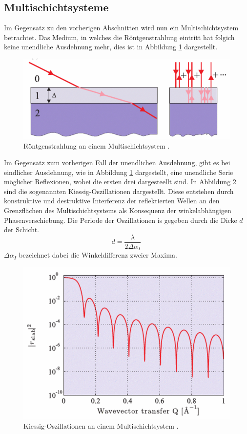 \subsection{Multischichtsysteme} \label{sec:multischicht}
Im Gegensatz zu den vorherigen Abschnitten wird nun ein Multischichtsystem betrachtet.
Das Medium, in welches die Röntgenstrahlung eintritt hat folgich keine unendliche Ausdehnung mehr, 
dies ist in Abbildung \ref{fig:multischicht} dargestellt.
\begin{figure}[H]
    \centering
    \includegraphics[scale=0.5]{Bilder/multischicht.png}
    \caption{Röntgenstrahlung an einem Multischichtsystem \cite{als-nielsen2011}.}
    \label{fig:multischicht}
\end{figure}
Im Gegensatz zum vorherigen Fall der unendlichen Ausdehnung, gibt es bei eindlicher Ausdehnung, 
wie in Abbildung \ref{fig:multischicht} dargestellt, 
eine unendliche Serie möglicher Reflexionen, wobei die ersten drei dargesteellt sind.
In Abbildung \ref{fig:oszillation} sind die sogenannten Kiessig-Oszillationen dargestellt.
Diese entstehen durch konstruktive und destruktive Interferenz der reflektierten Wellen an den Grenzflächen des Multischichtsystems als Konsequenz der winkelabhängigen Phasenverschiebung.
Die Periode der Oszillationen is gegeben durch die Dicke $d$ der Schicht.
\begin{equation}
    d = \frac{\lambda}{2 \Delta \alpha_I} \, 
    \label{eq:dicke}
\end{equation}
$\Delta \alpha_I$ bezeichnet dabei die Winkeldifferenz zweier Maxima.
\begin{figure}[H]
    \centering
    \includegraphics[scale=0.5]{Bilder/oszillation.png}
    \caption{Kiessig-Oszillationen an einem Multischichtsystem \cite{als-nielsen2011}.}
    \label{fig:oszillation}
\end{figure}
